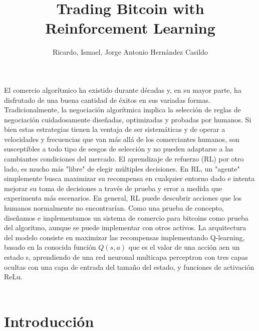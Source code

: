 \documentclass[12pt,letterpaper]{article}
\title{Trading Bitcoin with Reinforcement
Learning}
\author{Ricardo, Ismael, Jorge Antonio Hernández Casildo }
\begin{document}
\maketitle
\abstract El comercio algorítmico ha existido durante décadas y, en su mayor parte, ha disfrutado de una buena
cantidad de éxitos en sus variadas formas. Tradicionalmente, la negociación algorítmica implica la
selección de reglas de negociación cuidadosamente diseñadas, optimizadas y probadas por humanos. Si
bien estas estrategias tienen la ventaja de ser sistemáticas y de operar a velocidades y frecuencias que
van más allá de los comerciantes humanos, son susceptibles a todo tipo de sesgos de selección y no
pueden adaptarse a las cambiantes condiciones del mercado. El aprendizaje de refuerzo (RL) por otro
lado, es mucho más "libre" de elegir múltiples decisiones. En RL, un "agente" simplemente busca maximizar su recompensa
en cualquier entorno dado e intenta mejorar su toma de decisiones a través de prueba y error a medida
que experimenta más escenarios. En general, RL puede descubrir acciones que los humanos normalmente no encontrarían. Como una prueba de
concepto, diseñamos e implementamos un sistema de comercio para bitcoins como prueba del algoritmo, aunque se puede implementar con otros activos.
La arquitectura del modelo consiste en maximizar las recompensas implementando Q-learning, basado en la conocida función $Q(s,a)$ que es el valor de una acción aen un estado s, aprendiendo de una red neuronal multicapa perceptron con tres capas ocultas con una capa de entrada del tamaño del estado, y funciones de activación ReLu.
\\
\\
\section{Introducci\'on}
\end{document}
